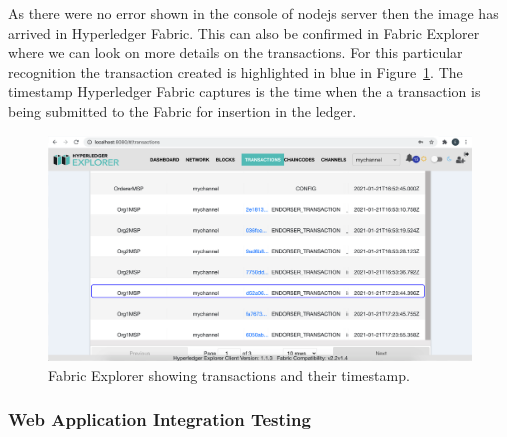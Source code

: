 As there were no error shown in the console of nodejs server then the image has arrived in Hyperledger Fabric. This can also be confirmed in Fabric Explorer where we can look on more details on the transactions. For this particular recognition the transaction created is highlighted in blue in Figure~\ref{fig:fabric_transactions}. The timestamp Hyperledger Fabric captures is the time when the a transaction is being submitted to the Fabric for insertion in the ledger. 

\begin{figure}[!htb]
    \centering
    \includegraphics[width=1\textwidth]{figures/explorer_transaction2.png}
    \caption{Fabric Explorer showing transactions and their timestamp.}
    \label{fig:fabric_transactions}
\end{figure}


\subsubsection{Web Application Integration Testing}

